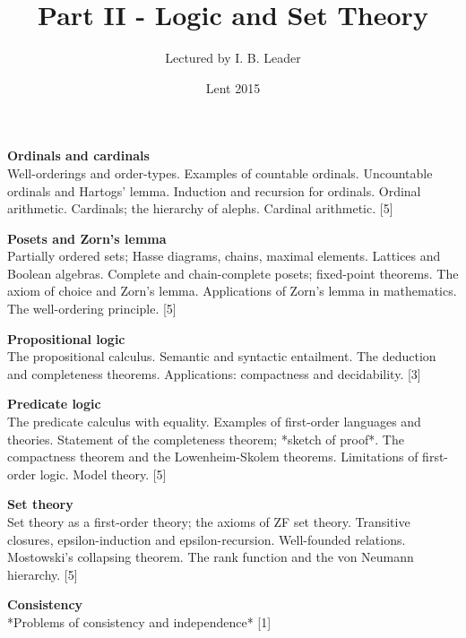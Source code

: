 \documentclass[a4paper]{article}
\title{Part II - Logic and Set Theory}
\author{Lectured by I. B. Leader}
\date{Lent 2015}
\begin{document}
\maketitle
{\small
  \noindent\textbf{Ordinals and cardinals}\\
  Well-orderings and order-types. Examples of countable ordinals. Uncountable ordinals and Hartogs' lemma. Induction and recursion for ordinals. Ordinal arithmetic. Cardinals; the hierarchy of alephs. Cardinal arithmetic.\hspace*{\fill} [5]

  \vspace{10pt}
  \noindent\textbf{Posets and Zorn's lemma}\\
  Partially ordered sets; Hasse diagrams, chains, maximal elements. Lattices and Boolean algebras. Complete and chain-complete posets; fixed-point theorems. The axiom of choice and Zorn's lemma. Applications of Zorn's lemma in mathematics. The well-ordering principle.\hspace*{\fill} [5]

  \vspace{10pt}
  \noindent\textbf{Propositional logic}\\
  The propositional calculus. Semantic and syntactic entailment. The deduction and completeness theorems. Applications: compactness and decidability.\hspace*{\fill} [3]

  \vspace{10pt}
  \noindent\textbf{Predicate logic}\\
  The predicate calculus with equality. Examples of first-order languages and theories. Statement of the completeness theorem; *sketch of proof*. The compactness theorem and the Lowenheim-Skolem theorems. Limitations of first-order logic. Model theory.\hspace*{\fill} [5]

  \vspace{10pt}
  \noindent\textbf{Set theory}\\ Set theory as a first-order theory; the axioms of ZF set theory. Transitive closures, epsilon-induction and epsilon-recursion. Well-founded relations. Mostowski's collapsing theorem. The rank function and the von Neumann hierarchy.\hspace*{\fill} [5]
  
  \vspace{10pt}
  \noindent\textbf{Consistency}\\
  *Problems of consistency and independence*\hspace*{\fill} [1]}
\end{document}
